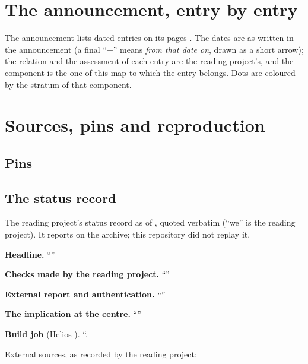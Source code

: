 \documentclass[11pt,a4paper,oneside]{article}
\begin{document}
\clearpage
\section{The announcement, entry by entry}\label{sec:timeline}

The announcement lists \NumTimeline{} dated entries on its pages \TimelinePages. The dates are as written in
the announcement (a final ``+'' means \emph{from that date on}, drawn as a short arrow); the relation and
the assessment of each entry are the reading project's, and the component is the one of this map to
which the entry belongs. Dots are coloured by the stratum of that component.

\begin{center}

\end{center}


\clearpage
\section{Sources, pins and reproduction}\label{sec:pins}

\subsection{Pins}


\subsection{The status record}\label{sec:status}
The reading project's status record as of \StatusAsOf, quoted verbatim (``we'' is the reading project).
It reports on the archive; this repository did not replay it.

\noindent\textbf{Headline.} ``\StatusHeadline''

\noindent\textbf{Checks made by the reading project.} ``\StatusNative''

\noindent\textbf{External report and authentication.} ``\StatusExternal''

\noindent\textbf{The implication at the centre.} ``\StatusDetail''

\noindent\textbf{Build job} (Helios \StatusJob). ``\StatusFull.

\noindent External sources, as recorded by the reading project:

\end{document}
